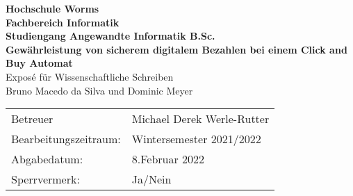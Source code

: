 \begin{titlepage}
    \vspace*{2mm}
    \begin{center}
        \Large
        \textbf{Hochschule Worms}\\
        \textbf{Fachbereich Informatik}\\
        \textbf{Studiengang Angewandte Informatik B.Sc.}\\
        \vspace{1cm}
        \textbf{Gewährleistung von sicherem digitalem Bezahlen bei einem Click and Buy Automat}\\
        \vspace{1cm}
        \large
        Exposé für Wissenschaftliche Schreiben\\
        \vspace{1cm}
        Bruno Macedo da Silva und Dominic Meyer
        \vspace{3cm}
        \large
        \vspace{4cm}
         \begin {table}[ht]
             \centering
             \begin{tabular}{l l}
                Betreuer                & Michael Derek Werle-Rutter \\
                Bearbeitungszeitraum:   & Wintersemester 2021/2022 \\
                Abgabedatum:            & 8.Februar 2022 \\
                Sperrvermerk:           & Ja/Nein \\
             \end{tabular}
         \end {table}
    \end{center}
    \normalsize
    \vfill
 


\end{titlepage}